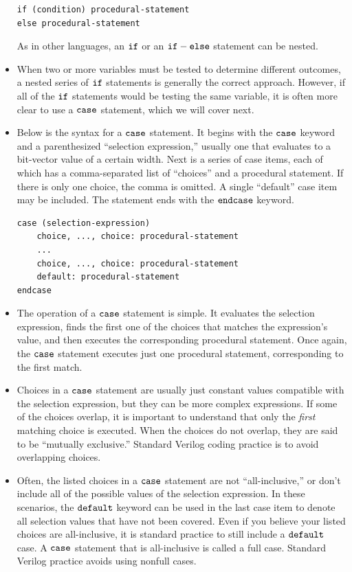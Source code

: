 \documentclass[10pt,a4paper]{article}
\begin{document}
\begin{itemize}
\begin{lstlisting}
if (condition) procedural-statement
else procedural-statement
\end{lstlisting}
As in other languages, an $\tt{if}$ or an $\tt{if-else}$ statement can be nested. 
\item When two or more variables must be tested to determine different outcomes, a nested series of $\tt{if}$ statements is generally the correct approach. However, if all of the $\tt{if}$ statements would be testing the same variable, it is often more clear to use a $\tt{case}$ statement, which we will cover next.
\item Below is the syntax for a $\tt{case}$ statement. It begins with the $\tt{case}$ keyword and a parenthesized ``selection expression,'' usually one that evaluates to a bit-vector value of a certain width. Next is a series of case items, each of which has a comma-separated list of ``choices'' and a procedural statement. If there is only one choice, the comma is omitted. A single ``default'' case item may be included. The statement ends with the $\tt{endcase}$ keyword. 
\begin{lstlisting}
case (selection-expression)
	choice, ..., choice: procedural-statement
	...
	choice, ..., choice: procedural-statement
	default: procedural-statement
endcase
\end{lstlisting}
\item The operation of a $\tt{case}$ statement is simple. It evaluates the selection expression, finds the first one of the choices that matches the expression's value, and then executes the corresponding procedural statement. Once again, the $\tt{case}$ statement executes just one procedural statement, corresponding to the first match.
\item Choices in a $\tt{case}$ statement are usually just constant values compatible with the selection expression, but they can be more complex expressions. If some of the choices overlap, it is important to understand that only the \textit{first} matching choice is executed. When the choices do not overlap, they are said to be ``mutually exclusive.'' Standard Verilog coding practice is to avoid overlapping choices.
\item Often, the listed choices in a $\tt{case}$ statement are not ``all-inclusive,'' or don't include all of the possible values of the selection expression. In these scenarios, the $\tt{default}$ keyword can be used in the last case item to denote all selection values that have not been covered. Even if you believe your listed choices are all-inclusive, it is standard practice to still include a $\tt{default}$ case. A $\tt{case}$ statement that is all-inclusive is called a full case. Standard Verilog practice avoids using nonfull cases.

\end{itemize}
\end{document}

